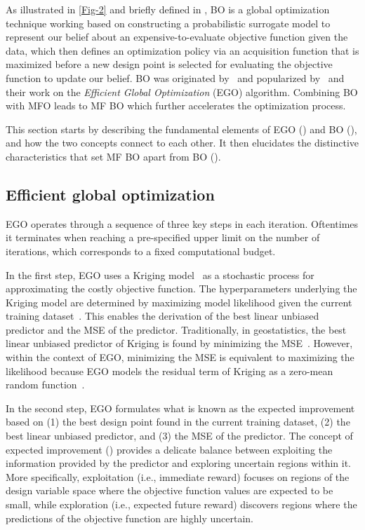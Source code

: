 \documentclass[journal ]{new-aiaa}
\newcommand{\edit}[1]{\textcolor{red}{#1}} %
\begin{document}
As illustrated in \cref{Fig-2} and briefly defined in , BO is a global optimization technique working based on constructing a probabilistic surrogate model %
{to represent our belief about an expensive-to-evaluate objective function given the data, which then defines an optimization policy via an acquisition function that is maximized} before a new design point is selected for evaluating the objective function %
{to update our belief}.
BO was originated by~\citet{Mockus1975} and popularized by~\citet{Jones1998} and their work on the \textit{Efficient Global Optimization} (EGO) algorithm.
Combining BO with MFO leads to MF BO which further accelerates the optimization process.
 
This section starts by describing the fundamental elements of EGO () and BO (), and how the two concepts connect to each other.
It then elucidates the distinctive characteristics that set MF BO apart from BO ().

\subsection{Efficient global optimization}\label{Sec31}

EGO operates through a sequence of three key steps in each iteration.
Oftentimes it terminates when reaching a pre-specified upper limit on the number of iterations,
which corresponds to a fixed computational budget. 

In the first step, EGO uses a Kriging model~\citep{Sacks1989,Chiles1999}
as a stochastic process for approximating the costly objective function.
The hyperparameters underlying the Kriging model are determined by maximizing
{model likelihood given} the current training dataset~\citep{Jones1998}.
This enables the derivation of the best linear unbiased predictor and the MSE of the predictor.
Traditionally, in geostatistics, the best linear unbiased predictor of Kriging is found by
minimizing the MSE~\citep{Sacks1989,Chiles1999,Kleijnen2009}. 
However, within the context of EGO, minimizing the MSE is equivalent to maximizing the likelihood
because EGO models the residual term of Kriging as a zero-mean random function~\citep{Jones1998}.

In the second step, EGO formulates what is known as the expected improvement based on (1) the best design point found in the current training dataset, (2) the best linear unbiased predictor, and (3) the MSE of the predictor.
The concept of expected improvement () provides a delicate balance between exploiting the information provided by the predictor and exploring uncertain regions within it.
{More specifically, exploitation (i.e., immediate reward) focuses on regions of the design variable space where the objective function values are expected to be small, while exploration (i.e., expected future reward) discovers regions where the predictions of the objective function are highly uncertain.} 
\end{document}
